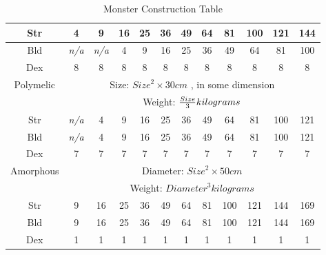 \documentclass[twoside]{book}
\begin{document}
\begin{table}[!htb]
\begin{center}
\begin{tabular}{|c|c|c|c|c|c|c|c|c|c|c|c|}
\hline Str & 4 & 9 & 16 & 25 & 36 & 49 & 64 & 81 & 100 & 121 & 144 \\

\hline Bld &
                    \textit{n/a}
                  &
                    \textit{n/a}
                  & 4 & 9 & 16 & 25 & 36 & 49 & 64 & 81 & 100 \\

\hline Dex & 8 & 8 & 8 & 8 & 8 & 8 & 8 & 8 & 8 & 8 & 8 \\

\hline Polymelic &
\multicolumn{11}{c}{
              Size: \begin{math}  
                        {Size}^{ 2 }   \times   30 cm
                           \end{math} , in some dimension
                  }\\

&
\multicolumn{11}{c}{
             Weight: \begin{math}  {{Size
                    }\over{ 3 }}  kilograms 
                     \end{math}
                  }\\

\hline Str &
                    \textit{n/a}
                  & 4 & 9 & 16 & 25 & 36 & 49 & 64 & 81 & 100 & 121 \\

\hline Bld &
                    \textit{n/a}
                  & 4 & 9 & 16 & 25 & 36 & 49 & 64 & 81 & 100 & 121 \\

\hline Dex & 7 & 7 & 7 & 7 & 7 & 7 & 7 & 7 & 7 & 7 & 7 \\

\hline Amorphous &
\multicolumn{11}{c}{
              Diameter: \begin{math}  
                        {Size}^{ 2 }   \times   50 cm
                            \end{math}
                  }\\

&
\multicolumn{11}{c}{
             Weight: \begin{math}  
                        {Diameter}^{ 3 }  kilograms  \end{math}  
                  }\\

\hline Str & 9 & 16 & 25 & 36 & 49 & 64 & 81 & 100 & 121 & 144 & 169 \\

\hline Bld & 9 & 16 & 25 & 36 & 49 & 64 & 81 & 100 & 121 & 144 & 169 \\

\hline Dex & 1 & 1 & 1 & 1 & 1 & 1 & 1 & 1 & 1 & 1 & 1 \\

\hline
  \end{tabular}
  
\caption{Monster Construction Table}
  
  \end{center}
\end{table}
  
\end{document}
